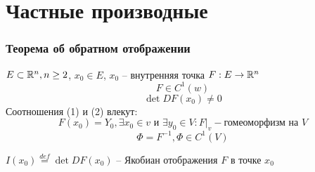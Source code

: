 \documentclass[main]{subfiles}
\begin{document}
\chapter{Частные производные}
\subsection*{Теорема об обратном отображении}
    $E \subset {\mathbb{R}}^n, n \geq 2$, $x_0 \in E$, $x_0 $ -- внутренняя точка
    $F: E \rightarrow {\mathbb{R}}^n$
    \[F \in C^{1}(w) \tag{1}\]
    \[ \det DF(x_0) \ne 0 \tag{2}\]
    Соотношения (1) и (2) влекут:
        \[F(x_0) = Y_0, \exists x_0 \in v \text{ и }\exists y_0 \in V:
        F|_v - \text{гомеоморфизм на } V  \tag{3} \]
        \[ \Phi = F^{-1}, \Phi \in C^1(V) \tag{4}\]

        \begin{definition}[Якобиан]
        $I(x_0) \stackrel{def}{=} \det DF(x_0)$ -- Якобиан отображения $F$ в точке $x_0$
        \end{definition}
\end{document}
